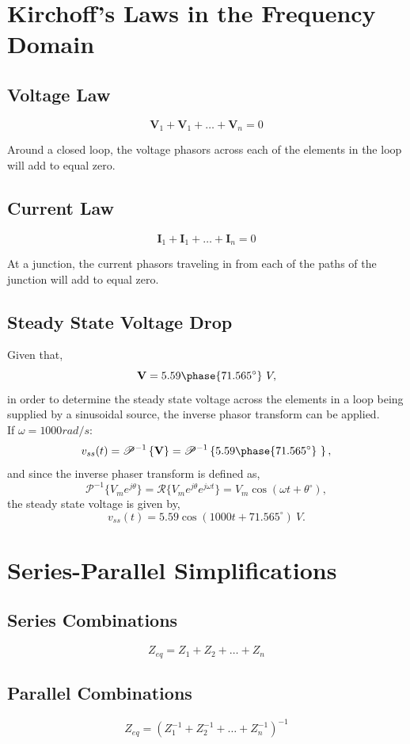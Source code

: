 \documentclass[12pt]{article}
\begin{document}
    \section*{Kirchoff's Laws in the Frequency Domain}
    \subsection*{Voltage Law}
    \[
        \textbf{V}_1 + \textbf{V}_1 + \ldots + \textbf{V}_n = 0
    \]
    \par Around a closed loop, the voltage phasors across each of the elements
    in the loop will add to equal zero.
    \subsection*{Current Law}
    \[
        \textbf{I}_1 + \textbf{I}_1 + \ldots + \textbf{I}_n = 0
    \]
    \par At a junction, the current phasors traveling in from each of the paths
    of the junction will add to equal zero.
    \subsection*{Steady State Voltage Drop}
    Given that,
    \[
        \textbf{V} = 5.59 \phase{71.565^{\circ}}\ V
    ,\]
    in order to determine the steady state voltage across the elements in a loop
    being supplied by a sinusoidal source, the inverse phasor transform can be
    applied. \\
    If $\omega = 1000 rad / s$:
    \[
        v_{ss}(t) = \mathscr{P}^{-1} \left\{ \textbf{V} \right\} =
        \mathscr{P}^{-1} \left\{ 5.59 \phase{71.565^{\circ}}\ \right\}
    ,\]
    and since the inverse phaser transform is defined as,
    \[
        \mathscr{P}^{-1} \{V_m e^{j \theta}\} = \mathscr{R} \{V_m e^{j \theta}
        e^{j \omega t}\} = V_m \cos (\omega t + \theta^{\circ})
    ,\]
    the steady state voltage is given by,
    \[
        v_{ss}(t) = 5.59 \cos (1000t + 71.565^{\circ})\ V
    .\]
    \section*{Series-Parallel Simplifications}
    \subsection*{Series Combinations}
    \[
        Z_{eq} = Z_1 + Z_2 + \ldots + Z_n
    \]
    \subsection*{Parallel Combinations}
    \[
        Z_{eq} = \left( Z_1^{-1} + Z_2^{-1} + \ldots + Z_n^{-1} \right)^{-1}
    \]
\end{document}
